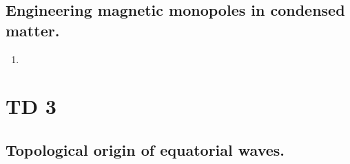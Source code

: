 \documentclass[10pt,a4paper]{book}
\begin{document}
\section{Engineering magnetic monopoles in condensed matter.}

\begin{enumerate}

\item 

\end{enumerate}

\chapter{TD 3}
\section{Topological origin of equatorial waves.}
\end{document}
